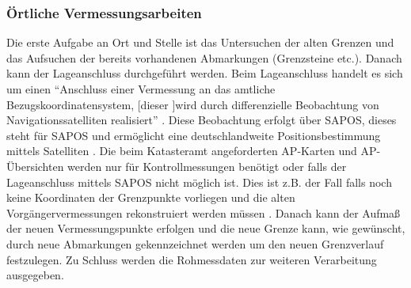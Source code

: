 
\subsubsection{Örtliche Vermessungsarbeiten}

Die erste Aufgabe an Ort und Stelle ist das Untersuchen der alten Grenzen und das Aufsuchen der bereits vorhandenen Abmarkungen (Grenzsteine etc.).
Danach kann der Lageanschluss durchgeführt werden. Beim Lageanschluss handelt es sich um einen "`Anschluss einer Vermessung an das amtliche Bezugskoordinatensystem, [dieser ]wird durch differenzielle Beobachtung von Navigationssatelliten realisiert"' \autocite{bier-lage}.
Diese Beobachtung erfolgt über \acs{SAPOS}, dieses steht für \acl{SAPOS} und ermöglicht eine deutschlandweite Positionsbestimmung mittels Satelliten \autocite[vgl.][2]{sapos-prospekt}.
Die beim Katasteramt angeforderten AP-Karten und AP-Übersichten werden nur für Kontrollmessungen benötigt oder falls der Lageanschluss mittels \acs{SAPOS} nicht möglich ist. Dies ist z.B. der Fall falls noch keine Koordinaten der Grenzpunkte vorliegen und die alten Vorgängervermessungen rekonstruiert werden müssen \autocite[vgl.][]{wolff-gps}. 
Danach kann der Aufmaß der neuen Vermessungspunkte  erfolgen und 
die neue Grenze kann, wie gewünscht, durch neue Abmarkungen gekennzeichnet werden um den neuen Grenzverlauf festzulegen. Zu Schluss werden die Rohmessdaten zur weiteren Verarbeitung ausgegeben.

